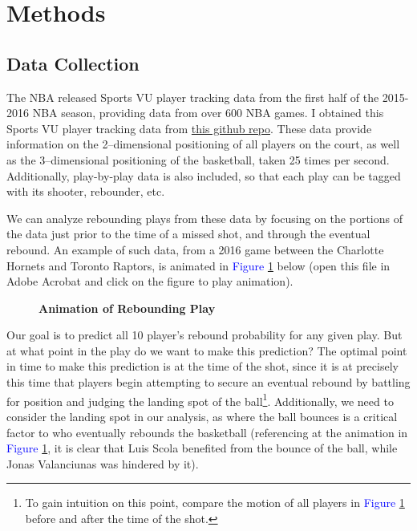 \documentclass{article}
\begin{document}
\section{Methods}

\subsection{Data Collection}

\noindent
The NBA released Sports VU player tracking data from the first half of the 2015-2016 NBA season, providing data from over 600 NBA games. I obtained this Sports VU player tracking data from \href{https://github.com/sealneaward/nba-movement-data}{this github repo}. These data provide information on the 2--dimensional positioning of all players on the court, as well as the 3--dimensional positioning of the basketball, taken 25 times per second. Additionally, play-by-play data is also included, so that each play can be tagged with its shooter, rebounder, etc.

\bigbreak
\noindent
We can analyze rebounding plays from these data by focusing on the portions of the data just prior to the time of a missed shot, and through the eventual rebound. An example of such data, from a 2016 game between the Charlotte Hornets and Toronto Raptors, is animated in \textcolor{blue}{Figure} \ref{fig:ReboundExAnimation} below (open this file in Adobe Acrobat and click on the figure to play animation).

\begin{figure}[htb]
\caption{\bf{Animation of Rebounding Play}}
\label{fig:ReboundExAnimation}
\end{figure}

\noindent
Our goal is to predict all 10 player's rebound probability for any given play. But at what point in the play do we want to make this prediction? The optimal point in time to make this prediction is at the time of the shot, since it is at precisely this time that players begin attempting to secure an eventual rebound by battling for position and judging the landing spot of the ball\footnote{To gain intuition on this point, compare the motion of all players in \textcolor{blue}{Figure} \ref{fig:ReboundExAnimation} before and after the time of the shot.}. Additionally, we need to consider the landing spot in our analysis, as where the ball bounces is a critical factor to who eventually rebounds the basketball (referencing at the animation in \textcolor{blue}{Figure} \ref{fig:ReboundExAnimation}, it is clear that Luis Scola benefited from the bounce of the ball, while Jonas Valanciunas was hindered by it). 
\end{document}
